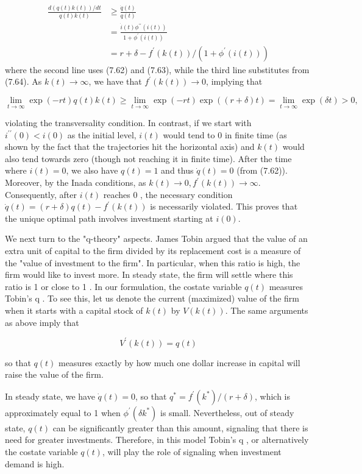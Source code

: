 \documentclass[\topdir/lecture_notes.tex]{subfiles}
\begin{document}
\[
\begin{aligned}
\frac{d(q(t) k(t)) / d t}{q(t) k(t)} & \geq \frac{\dot{q}(t)}{q(t)} \\
& =\frac{\dot{i}(t) \phi^{\prime \prime}(i(t))}{1+\phi^{\prime}(i(t))} \\
& =r+\delta-f^{\prime}(k(t)) /\left(1+\phi^{\prime}(i(t))\right)
\end{aligned}
\]
where the second line uses (7.62) and (7.63), while the third line substitutes from (7.64). As $k(t) \rightarrow \infty$, we have that $f^{\prime}(k(t)) \rightarrow 0$, implying that

\[
\lim _{t \rightarrow \infty} \exp (-r t) q(t) k(t) \geq \lim _{t \rightarrow \infty} \exp (-r t) \exp ((r+\delta) t)=\lim _{t \rightarrow \infty} \exp (\delta t)>0,
\]

violating the transversality condition. In contrast, if we start with $i^{\prime \prime}(0)<i(0)$ as the initial level, $i(t)$ would tend to 0 in finite time (as shown by the fact that the trajectories hit the horizontal axis) and $k(t)$ would also tend towards zero (though not reaching it in finite time). After the time where $i(t)=0$, we also have $q(t)=1$ and thus $\dot{q}(t)=0$ (from (7.62)). Moreover, by the Inada conditions, as $k(t) \rightarrow 0, f^{\prime}(k(t)) \rightarrow \infty$. Consequently, after $i(t)$ reaches 0 , the necessary condition $\dot{q}(t)=(r+\delta) q(t)-f^{\prime}(k(t))$ is necessarily violated. This proves that the unique optimal path involves investment starting at $i(0)$.

We next turn to the "q-theory" aspects. James Tobin argued that the value of an extra unit of capital to the firm divided by its replacement cost is a measure of the "value of investment to the firm". In particular, when this ratio is high, the firm would like to invest more. In steady state, the firm will settle where this ratio is 1 or close to 1 . In our formulation, the costate variable $q(t)$ measures Tobin's q . To see this, let us denote the current (maximized) value of the firm when it starts with a capital stock of $k(t)$ by $V(k(t))$. The same arguments as above imply that

\[
V^{\prime}(k(t))=q(t)
\]

so that $q(t)$ measures exactly by how much one dollar increase in capital will raise the value of the firm.

In steady state, we have $\dot{q}(t)=0$, so that $q^{*}=f^{\prime}\left(k^{*}\right) /(r+\delta)$, which is approximately equal to 1 when $\phi^{\prime}\left(\delta k^{*}\right)$ is small. Nevertheless, out of steady state, $q(t)$ can be significantly greater than this amount, signaling that there is need for greater investments. Therefore, in this model Tobin's q , or alternatively the costate variable $q(t)$, will play the role of signaling when investment demand is high.
\end{document}

